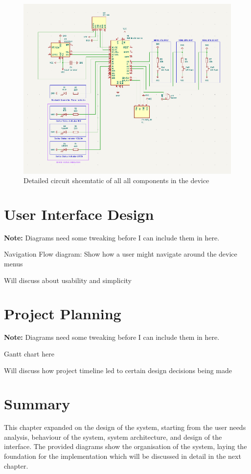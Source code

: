 \begin{figure}[H]
\centering
\includegraphics[scale=0.6]{diagrams/schematic_rev2}
\caption{Detailed circuit shcemtatic of all all components in the device}
\label{fig:circuit_diagram}
\end{figure}

\section{User Interface Design} %
\textbf{Note:} Diagrams need some tweaking before I can include them in here.

Navigation Flow diagram: Show how a user might navigate around the device menus

Will discuss about usability and simplicity

\section{Project Planning} %
\textbf{Note:} Diagrams need some tweaking before I can include them in here.

Gantt chart here

Will discuss how project timeline led to certain design decisions being made

\section{Summary} %
This chapter expanded on the design of the system, starting from the user needs analysis, behaviour of the system, system architecture, and design of the interface. The provided diagrams show the organisation of the system, laying the foundation for the implementation which will be discussed in detail in the next chapter.
